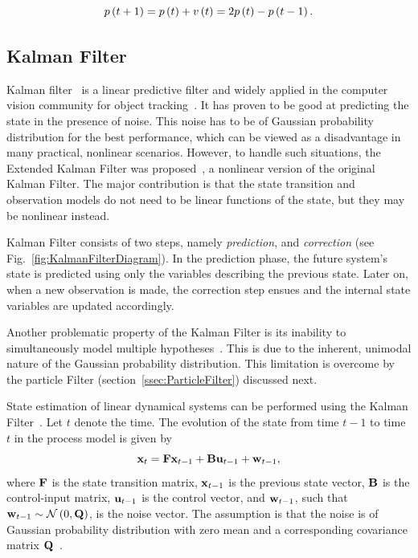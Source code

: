 \begin{equation}
    \label{eq:TrivialMotionModel}
    {p} \left( t + 1 \right) = {p} \left( t \right) + {v} \left( t \right) = 2{p} \left( t \right) - {p} \left( t - 1 \right).
\end{equation}

\subsection{Kalman Filter}
\label{ssec:KalmanFiler}

Kalman filter~\cite{Kalman1960, welch1995introduction} is a linear predictive filter and widely applied in the computer vision community for object tracking~\cite{Jalal2012}. It has proven to be good at predicting the state in the presence of noise. This noise has to be of Gaussian probability distribution for the best performance, which can be viewed as a disadvantage in many practical, nonlinear scenarios. However, to handle such situations, the Extended Kalman Filter was proposed~\cite{welch1995introduction}, a nonlinear version of the original Kalman Filter. The major contribution is that the state transition and observation models do not need to be linear functions of the state, but they may be nonlinear instead.

Kalman Filter consists of two steps, namely \emph{prediction}, and \emph{correction} (see Fig.~\ref{fig:KalmanFilterDiagram}). In the prediction phase, the future system's state is predicted using only the variables describing the previous state. Later on, when a new observation is made, the correction step ensues and the internal state variables are updated accordingly.

Another problematic property of the Kalman Filter is its inability to simultaneously model multiple hypotheses~\cite{welch1995introduction}. This is due to the inherent, unimodal nature of the Gaussian probability distribution. This limitation is overcome by the particle Filter (section~\ref{ssec:ParticleFilter}) discussed next.

State estimation of linear dynamical systems can be performed using the Kalman Filter~\cite{kim2018introduction}. Let $t$ denote the time. The evolution of the state from time $t - 1$ to time $t$ in the process model is given by
\begin{equation}
    \mathbf{x}_t = \mathbf{F} \mathbf{x}_{t - 1} + \mathbf{B} \mathbf{u}_{t - 1} + \mathbf{w}_{t - 1},
\end{equation}
where $\mathbf{F}$ is the state transition matrix, $\mathbf{x}_{t - 1}$ is the previous state vector, $\mathbf{B}$ is the control-input matrix, $\mathbf{u}_{t - 1}$ is the control vector, and $\mathbf{w}_{t - 1}$, such that $\mathbf{w}_{t - 1} \sim \mathcal{N} \left( {0, \mathbf{Q}} \right)$, is the noise vector. The assumption is that the noise is of Gaussian probability distribution with zero mean and a corresponding covariance matrix $\mathbf{Q}$~\cite{kim2018introduction}.

